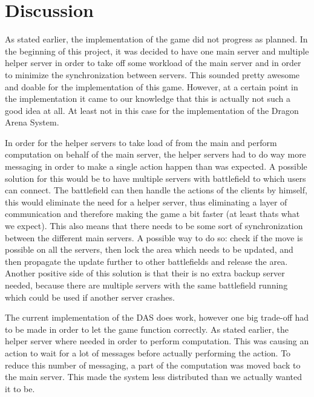 \section{Discussion}
As stated earlier, the implementation of the game did not progress as planned.
In the beginning of this project, it was decided to have one main server and multiple helper server in order to take off some workload of the main server and in order to minimize the synchronization between servers.
This sounded pretty awesome and doable for the implementation of this game.
However, at a certain point in the implementation it came to our knowledge that this is actually not such a good idea at all.
At least not in this case for the implementation of the Dragon Arena System.

In order for the helper servers to take load of from the main and perform computation on behalf of the main server, the helper servers had to do way more messaging in order to make a single action happen than was expected.
A possible solution for this would be to have multiple servers with battlefield to which users can connect.
The battlefield can then handle the actions of the clients by himself, this would eliminate the need for a helper server, thus eliminating a layer of communication and therefore making the game a bit faster (at least thats what we expect). 
This also means that there needs to be some sort of synchronization between the different main servers.
A possible way to do so: check if the move is possible on all the servers, then lock the area which needs to be updated, and then propagate the update further to other battlefields and release the area.
Another positive side of this solution is that their is no extra backup server needed, because there are multiple servers with the same battlefield running which could be used if another server crashes.

The current implementation of the DAS does work, however one big trade-off had to be made in order to let the game function correctly.
As stated earlier, the helper server where needed in order to perform computation. 
This was causing an action to wait for a lot of messages before actually performing the action.
To reduce this number of messaging, a part of the computation was moved back to the main server.
This made the system less distributed than we actually wanted it to be.

